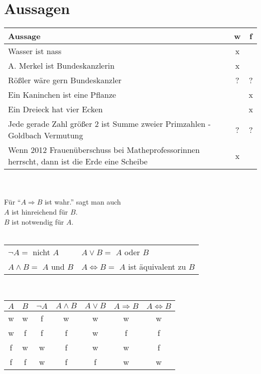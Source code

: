 \section{Aussagen}
\begin{center}
\begin{tabular}{l|c|c}
Aussage & w & f\\ \hline
Wasser ist nass & x & \\
A. Merkel ist Bundeskanzlerin & x & \\
Rößler wäre gern Bundeskanzler & ? & ?\\
Ein Kaninchen ist eine Pflanze & & x\\
Ein Dreieck hat vier Ecken & & x\\
Jede gerade Zahl größer 2 ist Summe zweier Primzahlen - Goldbach Vermutung & ? & ? \\
Wenn 2012 Frauenüberschuss bei Matheprofessorinnen herrscht, dann ist die Erde eine Scheibe & x &\\
\end{tabular}

\quad\\
\quad\\

Für "`$ A \Rightarrow B$ ist wahr."' sagt man auch \\
$A$ ist hinreichend für $B$. \\
$B$ ist notwendig für $A$. \\

\quad\\

\begin{tabular}{ll}
	$\neg A=$ nicht $A$ & $A \vee B =$ $A$ oder $B$\\
	$A \wedge B =$ $A$ und $B$ & $A \Leftrightarrow B =$ $A$ ist äquivalent zu $B$\\
\end{tabular}

\quad\\

\begin{tabular}{cc||ccccc}
$A$ & $B$ & $\neg A$ & $A \wedge B$ & $A \vee B$ & $A \Rightarrow B$ & $A \Leftrightarrow B$\\ \hline
w & w & f & w & w & w & w \\
w & f & f & f &w & f & f \\
f & w & w & f & w & w & f \\
f & f & w & f & f & w & w\\
\end{tabular}
\end{center}
%
%
%
